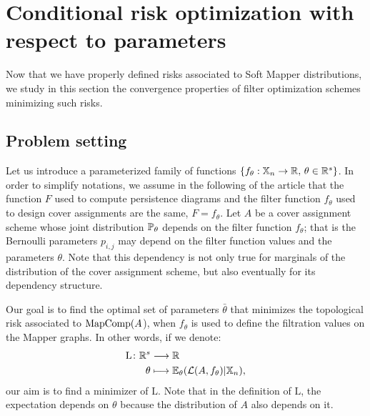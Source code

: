  \section{Conditional risk optimization with respect to parameters}
\label{sec:optim}

Now that we have properly defined risks associated to Soft Mapper distributions, we study in this section the convergence properties of 
filter optimization schemes minimizing such risks. 
 
\subsection{Problem setting}

Let us introduce a parameterized family of functions $\{ f_\theta :   \mathbb{X}_n  \rightarrow \mathbb{R} , \, \theta  \in \mathbb{R}^s\}$. 
In order to simplify notations, we assume in the following of the article that the function $F$ used to compute persistence diagrams and the filter function $f_\theta$ used to design cover assignments are the same, $F=f_\theta$. 
Let $A$ be a cover assignment scheme whose joint distribution $\mathbb P_\theta$ depends on the filter function $f_\theta$; 
that is the Bernoulli parameters $p_{i,j}$ may depend on the filter function values and the parameters $\theta$. %
Note that this dependency is not only true for marginals of the distribution of the cover assignment scheme,
but also eventually for its dependency structure.

Our goal is to find the optimal set of parameters $\bar \theta$ that minimizes the topological risk associated to  $\text{MapComp}(A$), when $f_\theta$ is used to define the filtration values on the Mapper graphs. 
In other words, if we denote:
\begin{align}
\text{L} \colon \mathbb{R}^s  &\longrightarrow \mathbb{R} \notag\\
\theta &\longmapsto \mathbb{E_\theta}(\mathcal{L}(A,f_\theta) | \mathbb{X}_n) \label{eq:L},
\end{align}
our aim is to find a minimizer of $\text{L}$. Note that in the definition of $\text{L}$, the expectation depends on $\theta$ because the distribution of $A$ also depends on it.

